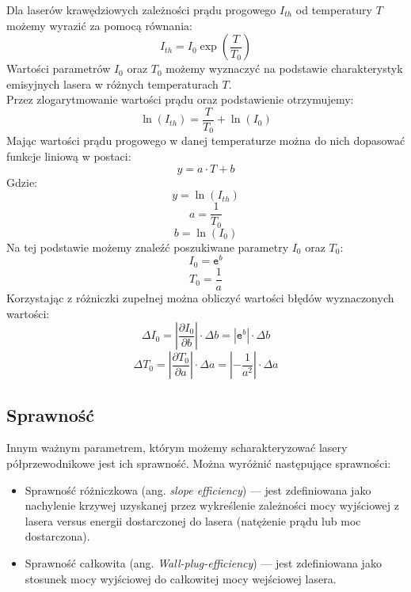 \documentclass[a4paper, portrait,12pt]{mwrep}
\begin{document}
\newpage
Dla laserów krawędziowych zależności prądu progowego $I_{th}$ od temperatury $T$ możemy wyrazić za pomocą równania:
\begin{equation}
I_{th} = I_0 \exp \left( \frac{T}{T_0} \right)
\end{equation}
Wartości parametrów $I_0$ oraz $T_0$ możemy wyznaczyć na podstawie charakterystyk
emisyjnych lasera w różnych temperaturach $T$. \\
Przez zlogarytmowanie wartości prądu oraz podstawienie otrzymujemy:
\begin{equation}
\ln(I_{th}) =    \frac{T}{T_0}  + \ln(I_0)
\end{equation}
Mając wartości prądu progowego w danej temperaturze  można do nich dopasować funkcje liniową w postaci:
\begin{equation}
y = a \cdot T + b
\end{equation}
Gdzie:
\begin{equation}
y = \ln(I_{th})
\end{equation}
\begin{equation}
a = \frac{1}{T_0}
\end{equation}
\begin{equation}
b = \ln(I_0)
\end{equation}
Na tej podstawie możemy znaleźć poszukiwane parametry $I_0$ oraz $T_0$:
\begin{equation}
I_0 = \mathtt{e}^b
\end{equation}
\begin{equation}
T_0 = \frac{1}{a}
\end{equation}
Korzystając z różniczki zupełnej można obliczyć wartości błędów wyznaczonych wartości:
\begin{equation}
\Delta I_0 = \left\lvert \frac{\partial I_{0}}{\partial b} \right\rvert \cdot \Delta b = | \mathtt{e}^b | \cdot \Delta b
\end{equation}
\begin{equation}
\Delta T_0 = \left\lvert \frac{\partial T_{0}}{\partial a} \right\rvert \cdot \Delta a = \left\lvert -\frac{1}{a^2} \right\rvert \cdot \Delta a
\end{equation}
\subsection{Sprawność}
Innym ważnym parametrem, którym możemy scharakteryzować lasery półprzewodnikowe jest ich sprawność. Można wyróżnić następujące sprawności:
\begin{itemize}
\item Sprawność różniczkowa (ang. \textit{slope efficiency}) --- jest zdefiniowana jako nachylenie krzywej uzyskanej przez wykreślenie zależności mocy wyjściowej z lasera versus energii dostarczonej do lasera (natężenie prądu lub moc dostarczona).
\item Sprawność całkowita (ang. \textit{Wall-plug-efficiency}) --- jest zdefiniowana jako stosunek mocy wyjściowej do całkowitej mocy wejściowej lasera.
\end{itemize}
\end{document}
